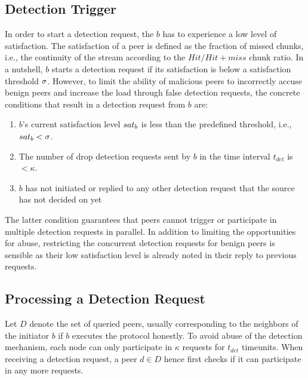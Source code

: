 \subsection{Detection Trigger}
\label{Detection-Trigger}


In order to start a detection request, the $b$ has to experience a low level of satisfaction. 
The satisfaction of a peer is defined as the fraction of missed chunks, i.e., the continuity of the stream according to the $Hit/Hit+miss$ chunk ratio.
In a nutshell, $b$ starts a detection request if its satisfaction is below a satisfaction threshold $\sigma$.
However, to limit the ability of malicious peers to incorrectly accuse benign peers and increase the load through false detection requests, the concrete conditions that result in a detection request from $b$ are: 
\begin{enumerate}
 \item $b$'s current satisfaction level $sat_b$ is less than the predefined threshold, i.e., $sat_b < \sigma$.
 \item The number of drop detection requests sent by $b$ in the time interval $t_{det}$ is $< \kappa$. 
 \item $b$ has not initiated or replied to any other \drop detection request that the source has not decided on yet
\end{enumerate}
The latter condition guarantees that peers cannot trigger or participate in multiple detection requests in parallel. In addition to limiting the opportunities for abuse, restricting the concurrent detection requests for benign peers is sensible as their low satisfaction level is already noted in their reply to previous requests. 

\subsection{Processing a Detection Request}
Let $D$ denote the set of queried peers, usually corresponding to the neighbors of the initiator $b$ if $b$ executes the protocol honestly.  
To avoid abuse of the detection mechanism, each node can only participate in $\kappa$ requests for $t_{det}$ timeunits. 
When receiving a detection request, a peer $d \in D$ hence first checks if it can participate in any more requests. 
    
